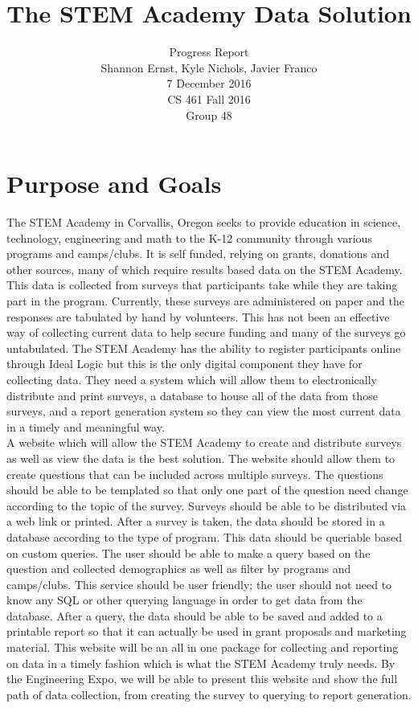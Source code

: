 \documentclass[letterpaper,10pt,serif, draftclsnofoot,onecolumn, compsoc, titlepage]{IEEEtran}
\title{The STEM Academy Data Solution}
\author{Progress Report \\ Shannon Ernst, Kyle Nichols, Javier Franco\\ 7 December 2016\\ CS 461 Fall 2016\\ Group 48}
\begin{document}
\maketitle
\newpage
\section{Purpose and Goals}
The STEM Academy in Corvallis, Oregon seeks to provide education in science, technology, engineering and math to the K-12 community through various programs and camps/clubs. It is self funded, relying on grants, donations and other sources, many of which require results based data on the STEM Academy. This data is collected from surveys that participants take while they are taking part in the program. Currently, these surveys are administered on paper and the responses are tabulated by hand by volunteers. This has not been an effective way of collecting current data to help secure funding and many of the surveys go untabulated. The STEM Academy has the ability to register participants online through Ideal Logic but this is the only digital component they have for collecting data. They need a system which will allow them to electronically distribute and print surveys, a database to house all of the data from those surveys, and a report generation system so they can view the most current data in a timely and meaningful way.\\
A website which will allow the STEM Academy to create and distribute surveys as well as view the data is the best solution. The website should allow them to create questions that can be included across multiple surveys. The questions should be able to be templated so that only one part of the question need change according to the topic of the survey. Surveys should be able to be distributed via a web link or printed. After a survey is taken, the data should be stored in a database according to the type of program. This data should be queriable based on custom queries. The user should be able to make a query based on the question and collected demographics as well as filter by programs and camps/clubs. This service should be user friendly; the user should not need to know any SQL or other querying language in order to get data from the database. After a query, the data should be able to be saved and added to a printable report so that it can actually be used in grant proposals and marketing material. This website will be an all in one package for collecting and reporting on data in a timely fashion which is what the STEM Academy truly needs. By the Engineering Expo, we will be able to present this website and show the full path of data collection, from creating the survey to querying to report generation.
\end{document}
